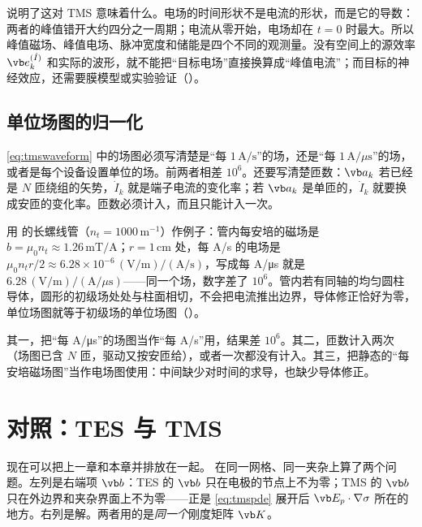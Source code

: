  说明了这对 TMS 意味着什么。电场的时间形状不是电流的形状，而是它的导数：两者的峰值错开大约四分之一周期；电流从零开始，电场却在 $t=0$ 时最大。所以峰值磁场、峰值电场、脉冲宽度和储能是四个不同的观测量。没有空间上的源效率 $\vb e_k^{(\dot I)}$ 和实际的波形，就不能把“目标电场”直接换算成“峰值电流”；而目标的神经效应，还需要膜模型或实验验证（）。

\subsection{单位场图的归一化}
\eqref{eq:tmswaveform} 中的场图必须写清楚是“每 $1\,\mathrm{A/s}$”的场，还是“每 $1\,\mathrm{A}/\mu\mathrm{s}$”的场，或者是每个设备设置单位的场。前两者相差 $10^6$。还要写清楚匝数：$\vb a_k$ 若已经是 $N$ 匝绕组的矢势，$\dot I_k$ 就是端子电流的变化率；若 $\vb a_k$ 是单匝的，$\dot I_k$ 就要换成安匝的变化率。匝数必须计入，而且只能计入一次。


用 的长螺线管（$n_t=1000\,\mathrm{m^{-1}}$）作例子：管内每安培的磁场是 $b=\mu_0n_t\approx1.26\,\mathrm{mT/A}$；$r=1\,\mathrm{cm}$ 处，每 A/s 的电场是 $\mu_0n_tr/2\approx6.28\times10^{-6}\,(\mathrm{V/m})/(\mathrm{A/s})$，写成每 A/μs 就是 $6.28\,(\mathrm{V/m})/(\mathrm{A}/\mu\mathrm{s})$——同一个场，数字差了 $10^6$。管内若有同轴的均匀圆柱导体，圆形的初级场处处与柱面相切，不会把电流推出边界，导体修正恰好为零，单位场图就等于初级场的单位场图（）。

\begin{pitfall}[单位场图的三个陷阱]
其一，把“每 A/μs”的场图当作“每 A/s”用，结果差 $10^6$。其二，匝数计入两次（场图已含 $N$ 匝，驱动又按安匝给），或者一次都没有计入。其三，把静态的“每安培磁场图”当作电场图使用：中间缺少对时间的求导，也缺少导体修正。
\end{pitfall}

\section{对照：TES 与 TMS}\label{sec:tms-vs-tes}

现在可以把上一章和本章并排放在一起。 在同一网格、同一夹杂上算了两个问题。左列是右端项 $\vb b$：TES 的 $\vb b$ 只在电极的节点上不为零；TMS 的 $\vb b$ 只在外边界和夹杂界面上不为零——正是 \eqref{eq:tmspde} 展开后 $\vb E_p\cdot\nabla\sigma$ 所在的地方。右列是解。两者用的是\emph{同一个}刚度矩阵 $\vb K$。

